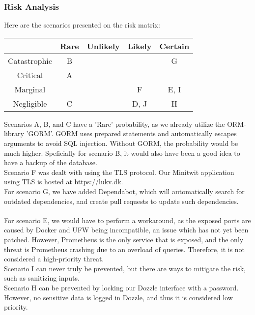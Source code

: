 \subsubsection{Risk Analysis}
Here are the scenarios presented on the risk matrix:
\begin{center}
\begin{tabular}{ |c|c|c|c|c| } 
 \hline
  & Rare & Unlikely & Likely & Certain \\ 
 \hline
 Catastrophic & B &  &  & G\\ 
 \hline
 Critical & A &  &  & \\ 
 \hline
 Marginal & &  &  F& E, I\\ 
 \hline
 Negligible & C &  & D, J & H\\ 
 \hline
\end{tabular}
\end{center}
Scenarios A, B, and C have a 'Rare' probability, as we already utilize the ORM-library 'GORM'. GORM uses prepared statements and automatically escapes arguments to avoid SQL injection. Without GORM, the probability would be much higher. Speficially for scenario B, it would also have been a good idea to have a backup of the database.\\
Scenario F was dealt with using the TLS protocol. Our Minitwit application using TLS is hosted at https://lukv.dk.\\
For scenario G, we have added Dependabot, which will automatically search for outdated dependencies, and create pull requests to update such dependencies.
\\\\
For scenario E, we would have to perform a workaround, as the exposed ports are caused by Docker and UFW being incompatible, an issue which has not yet been patched. However, Prometheus is the only service that is exposed, and the only threat is Prometheus crashing due to an overload of queries. Therefore, it is not considered a high-priority threat.\\
Scenario I can never truly be prevented, but there are ways to mitigate the risk, such as sanitizing inputs. 
\\
Scenario H can be prevented by locking our Dozzle interface with a password. However, no sensitive data is logged in Dozzle, and thus it is considered low priority.